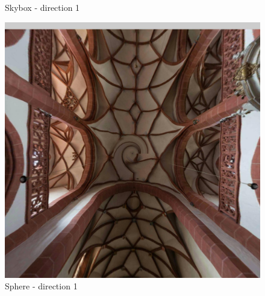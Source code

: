 \documentclass[12pt]{article}
\begin{document}
\begin{figure}[H]
\begin{minipage}[b]{0.3\textwidth}
    \caption{Skybox - direction 1}
    \label{fig:skybox_direction_1}
  \end{minipage}
  \hfill
  \begin{minipage}[b]{0.3\textwidth}
    \centering
    \includegraphics[width=1\textwidth]{../images/screenshots/Screenshot_2_Sphere.jpg}
    \caption{Sphere - direction 1}
    \label{fig:sphere_direction_1}
  \end{minipage}
\end{figure}
\end{document}
